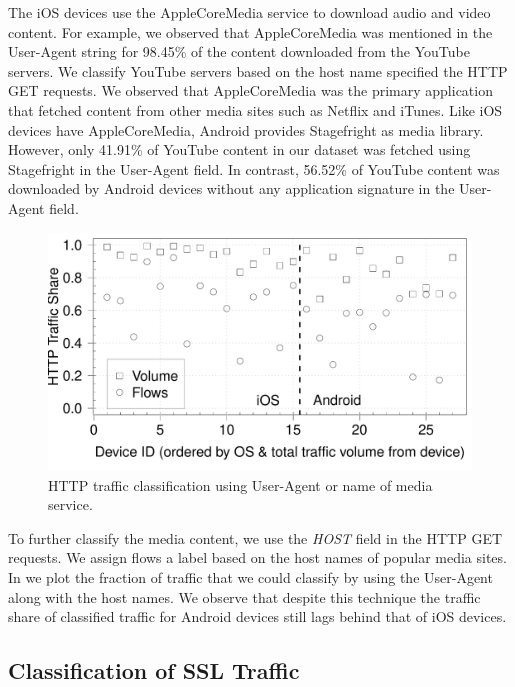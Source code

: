 The iOS devices use the AppleCoreMedia service to download audio and video content. 
For example, we observed that AppleCoreMedia was mentioned in the User-Agent string for 98.45\% of the content downloaded from the YouTube servers. 
We classify YouTube servers based on the host name specified the HTTP GET requests. 
We observed that AppleCoreMedia was the primary application that fetched content from other media sites such as Netflix and iTunes.
Like iOS devices have AppleCoreMedia, Android provides Stagefright\cite{stagefright} as media library.
However, only 41.91\% of YouTube content in our dataset was fetched using Stagefright in the User-Agent field. 
In contrast, 56.52\% of YouTube content was downloaded by Android devices without any application signature in the User-Agent field.  

\begin{figure}
\includegraphics[width=\columnwidth]{plots/appusage_someappservicesig_traffic.pdf}
\caption{HTTP traffic classification using User-Agent or name of media service.}
\label{fig:http-classification-app-service}
\end{figure}

To further classify the media content, we use the \emph{HOST} field in the HTTP GET requests.
We assign flows a label based on the host names of popular media sites. 
In  we plot the fraction of traffic that we could classify by using the User-Agent along with the host names. 
We observe that despite this technique the traffic share of classified traffic for Android devices still lags behind that of iOS devices. 


\subsection{Classification of SSL Traffic}

